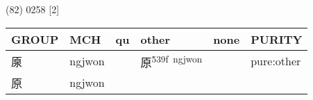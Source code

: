 \documentclass[14pt,a4paper]{scrartcl}
\begin{document}
(82) 0258 {[}2{]}

\begin{longtable}[c]{@{}llllll@{}}
\toprule
\begin{minipage}[b]{0.14\columnwidth}\raggedright\strut
GROUP
\strut\end{minipage} &
\begin{minipage}[b]{0.14\columnwidth}\raggedright\strut
MCH
\strut\end{minipage} &
\begin{minipage}[b]{0.14\columnwidth}\raggedright\strut
qu
\strut\end{minipage} &
\begin{minipage}[b]{0.14\columnwidth}\raggedright\strut
other
\strut\end{minipage} &
\begin{minipage}[b]{0.14\columnwidth}\raggedright\strut
none
\strut\end{minipage} &
\begin{minipage}[b]{0.14\columnwidth}\raggedright\strut
PURITY
\strut\end{minipage}\tabularnewline
\midrule
\endhead
\begin{minipage}[t]{0.14\columnwidth}\raggedright\strut
厡
\strut\end{minipage} &
\begin{minipage}[t]{0.14\columnwidth}\raggedright\strut
ngjwon
\strut\end{minipage} &
\begin{minipage}[t]{0.14\columnwidth}\raggedright\strut
\strut\end{minipage} &
\begin{minipage}[t]{0.14\columnwidth}\raggedright\strut
原\textsuperscript{539f~ngjwon}
\strut\end{minipage} &
\begin{minipage}[t]{0.14\columnwidth}\raggedright\strut
\strut\end{minipage} &
\begin{minipage}[t]{0.14\columnwidth}\raggedright\strut
pure:other
\strut\end{minipage}\tabularnewline
\begin{minipage}[t]{0.14\columnwidth}\raggedright\strut
原
\strut\end{minipage} &
\begin{minipage}[t]{0.14\columnwidth}\raggedright\strut
ngjwon
\strut\end{minipage} &
\begin{minipage}[t]{0.14\columnwidth}\raggedright\strut

\end{minipage}
\end{longtable}
\end{document}

